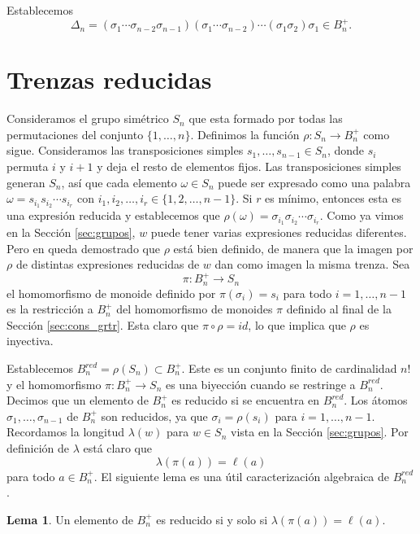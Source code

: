 \documentclass[12pt]{book}
\theoremstyle{definition}
\newtheorem{lema}{Lema}[section]
\begin{document}
Establecemos
$$\Delta_n = (\sigma_1\cdots\sigma_{n-2}\sigma_{n-1})(\sigma_1\cdots\sigma_{n-2})\cdots(\sigma_1\sigma_2)\sigma_1\in B_n^+.$$

\section{Trenzas reducidas}

Consideramos el grupo simétrico $S_n$ que esta formado por todas las permutaciones del conjunto $\{1,\ldots,n\}$. Definimos la función $\rho:S_n\rightarrow B_n^+$ como sigue. Consideramos las transposiciones simples $s_1,\ldots,s_{n-1}\in S_n$, donde $s_i$ permuta $i$ y $i+1$ y deja el resto de elementos fijos. Las transposiciones simples generan $S_n$, así que cada elemento $\omega\in S_n$ puede ser expresado como una palabra $\omega = s_{i_1}s_{i_2}\cdots s_{i_r}$ con $i_1,i_2,\ldots,i_r\in\{1,2,\ldots,n-1\}$. Si $r$ es mínimo, entonces esta es una expresión reducida y establecemos que $\rho(\omega)=\sigma_{i_1}\sigma_{i_2}\cdots \sigma_{i_r}$. Como ya vimos en la Sección \ref{sec:grupos}, $w$ puede tener varias expresiones reducidas diferentes. Pero en \cite{br_gr} queda demostrado que $\rho$ está bien definido, de manera que la imagen por $\rho$ de distintas expresiones reducidas de $w$ dan como imagen la misma trenza. Sea
$$\pi:B_n^+\rightarrow S_n$$
el homomorfismo de monoide definido por $\pi(\sigma_i)=s_i$ para todo $i=1,\ldots,n-1$ es la restricción a $B_n^+$ del homomorfismo de monoides $\pi$ definido al final de la Sección \ref{sec:cons_grtr}. Esta claro que $\pi\circ\rho = id$, lo que implica que $\rho$ es inyectiva.

Establecemos $B_n^{red}=\rho(S_n)\subset B_n^+$. Este es un conjunto finito de cardinalidad $n!$ y el homomorfismo $\pi:B_n^+\rightarrow S_n$ es una biyección cuando se restringe a $B_n^{red}$. Decimos que un elemento de $B_n^+$ es reducido si se encuentra en $B_n^{red}$. Los átomos $\sigma_1,\ldots,\sigma_{n-1}$ de $B_n^+$ son reducidos, ya que $\sigma_i=\rho(s_i)$ para $i=1,\ldots,n-1$. Recordamos la longitud $\lambda(w)$ para $w\in S_n$ vista en la Sección \ref{sec:grupos}. Por definición de $\lambda$ está claro que
$$\lambda(\pi(a))=\ell(a)$$
para todo $a\in B_n^+$. El siguiente lema es una útil caracterización algebraica de $B_n^{red}$.

\begin{lema}
Un elemento de $B_n^+$ es reducido si y solo si $\lambda(\pi(a))=\ell(a)$.
\label{lema:reduced1}
\end{lema}
\end{document}
